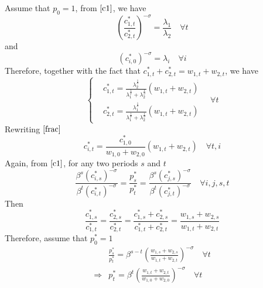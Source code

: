 \documentclass{article}
\begin{document}
\begin{enumerate}
        Assume that $p_0=1$, from \(\eqref{c1}\), we have
        \begin{equation}
            \left(\frac{c_{1,t}^\ast}{c_{2,t}^\ast}\right)^{-\sigma}=\frac{\lambda_1}{\lambda_2}\quad\forall t \label{c3}
        \end{equation}
        and
        \begin{equation}
            (c_{i,0}^\ast)^{-\sigma}=\lambda_i\quad\forall i\label{lambda}
        \end{equation}
        Therefore, together with the fact that $c_{1,t}^\ast+c_{2,t}^\ast=w_{1,t}+w_{2,t}$, we have
        \begin{equation}
            \left\{\begin{aligned}
                &c_{1,t}^\ast=\frac{\lambda_2^{\frac{1}{\sigma}}}{\lambda_1^{\frac{1}{\sigma}}+\lambda_2^{\frac{1}{\sigma}}}(w_{1,t}+w_{2,t})\\
                &c_{2,t}^\ast=\frac{\lambda_1^{\frac{1}{\sigma}}}{\lambda_1^{\frac{1}{\sigma}}+\lambda_2^{\frac{1}{\sigma}}}(w_{1,t}+w_{2,t})
            \end{aligned}\right.
            \quad\forall t \label{frac}
        \end{equation}
        Rewriting \(\eqref{frac}\)
        \begin{equation}
            c_{i,t}^\ast=\frac{c_{1,0}^\ast}{w_{1,0}+w_{2,0}}(w_{1,t}+w_{2,t}) \quad\forall t,i
        \end{equation}
        Again, from \(\eqref{c1}\), for any two periods $s$ and $t$ 
        \begin{equation}
            \frac{\beta^s(c_{i,s}^\ast)^{-\sigma}}{\beta^t (c_{i,t}^\ast)^{-\sigma}}=\frac{p_s^\ast}{p_t^\ast}=\frac{\beta^s(c_{j,s}^\ast)^{-\sigma}}{\beta^t (c_{j,t}^\ast)^{-\sigma}}\quad\forall i,j,s,t\label{p}
        \end{equation}
        Then
        \begin{equation*}
            \frac{c_{1,s}^\ast}{c_{1,t}^\ast}=\frac{c_{2,s}^\ast}{c_{2,t}^\ast}=\frac{c_{1,s}^\ast+c_{2,s}^\ast}{c_{1,t}^\ast+c_{2,t}^\ast}=\frac{w_{1,s}+w_{2,s}}{w_{1,t}+w_{2,t}}
        \end{equation*}
        Therefore, assume that $p_0^\ast=1$
        \begin{align}
            &\frac{p_s^\ast}{p_t^\ast}=\beta^{s-t}\left(\frac{w_{1,s}+w_{2,s}}{w_{1,t}+w_{2,t}}\right)^{-\sigma}\quad\forall t\label{p1}\\
            \Rightarrow&p_t^\ast=\beta^t\left(\frac{w_{1,t}+w_{2,t}}{w_{1,0}+w_{2,0}}\right)^{-\sigma}\quad\forall t \label{p2}

\end{align}
\end{enumerate}
\end{document}
